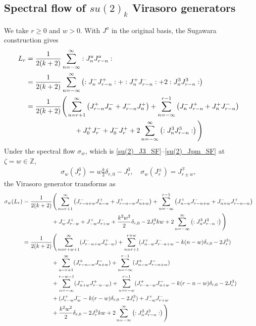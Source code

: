 \documentclass[11pt]{article}
\numberwithin{equation}{section}
\begin{document}
\subsection{Spectral flow of $su(2)_k$ Virasoro generators}
\label{su(2)_vir_SF}

We take $r\geq 0$ and $w>0$. With $J^a$ in the original basis, the Sugawara construction gives
 \begin{align}
 \begin{split}
     L_{r}&=\frac{1}{2(k+2)}\sum_{n=-\infty}^{\infty} :J^a_n J^a_{r-n}: \\
     &=\frac{1}{2(k+2)}\sum_{n=-\infty}^{\infty} \left(:J_n^-J_{r-n}^{+}:+:J_n^+J_{r-n}^{-}:+2:J_n^3J_{r-n}^3 : \right) \\
     &=\frac{1}{2(k+2)}\Bigg{(} \sum_{n=r+1}^{\infty} \left(J_{r-n}^+ J_n^{-}+J_{r-n}^- J_n^+ \right) +\sum_{n=-\infty}^{r-1}\left(J_n^-J_{r-n}^{+} +J_n^+ J_{r-n}^- \right)    \\
     & \quad \quad \quad \quad \quad \quad \quad + J_0^+J_r^-+J_0^-J_r^+ +2\sum_{n=-\infty}^{\infty}\left(:J_{n}^3 J_{r-n}^3:\right) \Bigg{)}
\end{split}
 \end{align}
 Under the spectral flow $\sigma_w$, which is \eqref{su(2)_J3_SF}--\eqref{su(2)_Jpm_SF} at $\zeta=w\in\mathbb{Z}$,
 \begin{align}
     \sigma_w(J_r^3)=w\frac{k}{2}\delta_{r,0}-J_r^3, \quad \sigma_w(J_r^{\pm})=J_{r\pm w}^{\mp},
 \end{align}
the Virasoro generator transforms as
\begin{align}
    \sigma_w(L_{r})&=\frac{1}{2(k+2)}\Bigg{(} \sum_{n=r+1}^{\infty} \left(J_{r-n+w}^- J_{n-w}^{+}+J_{r-n-w}^+ J_{n+w}^- \right) +\sum_{n=-\infty}^{r-1}\left(J_{n-w}^+J_{r-n+w}^{-} +J_{n+w}^- J_{r-n-w}^+ \right)   \nonumber \\
     & \quad \quad \quad \quad  \quad + J_w^-J_{r-w}^+ +J_{-w}^+ J_{r+w}^- +\frac{k^2w^2}{2}\delta_{r,0}-2J_r^3 kw+2\sum_{n=-\infty}^{\infty}\left(:J_{n}^3 J_{r-n}^3:\right) \Bigg{)} \nonumber \\
     &=\frac{1}{2(k+2)} \Bigg{(} \sum_{n=r+w+1}^{\infty}(J_{r-n+w}^- J_{n-w}^{+})+\sum_{n=r+1}^{r+w}(J_{n-w}^{+}J_{r-n+w}^- -k(n-w)\delta_{r,0}-2J_r^3) \nonumber \\
      & \quad \quad \quad \quad \quad  + \sum_{n=r+1}^{\infty}(J_{r-n-w}^+ J_{n+w}^-) + \sum_{n=-\infty}^{r-1}(J_{n-w}^+J_{r-n+w}^{-} ) \nonumber \\
      &\quad \quad \quad \quad \quad +\sum_{n=-\infty}^{r-w-1}(J_{n+w}^- J_{r-n-w}^+)+\sum_{n=r-w}^{r-1}(J_{r-n-w}^+J_{n+w}^- -k(r-n-w)\delta_{r,0}-2J_r^3) \nonumber \\
       &\quad \quad \quad \quad \quad + (J_{r-w}^+J_w^- -k(r-w)\delta_{r,0}-2J_r^3) +J_{-w}^+ J_{r+w}^- \nonumber \\
        &\quad \quad \quad \quad \quad +\frac{k^2w^2}{2}\delta_{r,0}-2J_r^3 kw+2\sum_{n=-\infty}^{\infty}\left(:J_{n}^3 J_{r-n}^3:\right) \Bigg{)}
\end{align}
\end{document}
